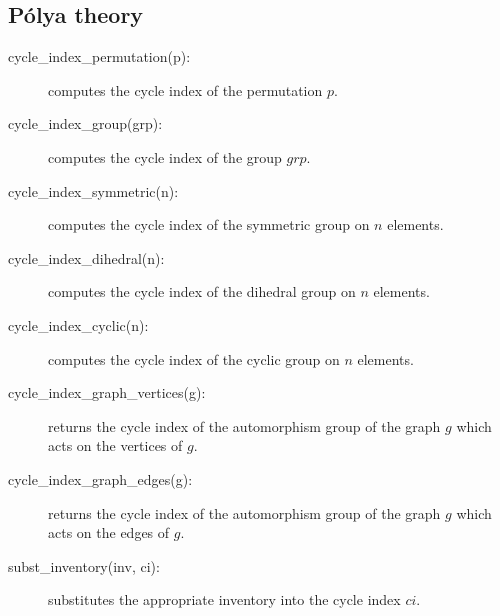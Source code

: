 \documentclass[11pt]{article}
\begin{document}
\subsection{P\'olya theory}

\begin{description}
  \item [cycle\_index\_permutation(p):] computes the cycle index of
    the permutation $p$.
  \item [cycle\_index\_group(grp):] computes the cycle index of the
    group $grp$.
  \item [cycle\_index\_symmetric(n):] computes the cycle index of the
    symmetric group on $n$ elements.
  \item [cycle\_index\_dihedral(n):] computes the cycle index of the
    dihedral group on $n$ elements.
  \item [cycle\_index\_cyclic(n):] computes the cycle index of the
    cyclic group on $n$ elements.
  \item [cycle\_index\_graph\_vertices(g):] returns the cycle index of
    the automorphism group of the graph $g$ which acts on the vertices
    of $g$.
  \item [cycle\_index\_graph\_edges(g):] returns the cycle index of
    the automorphism group of the graph $g$ which acts on the edges of
    $g$.
  \item [subst\_inventory(inv, ci):] substitutes the appropriate
    inventory into the cycle index $ci$.
\end{description}

\end{document}
